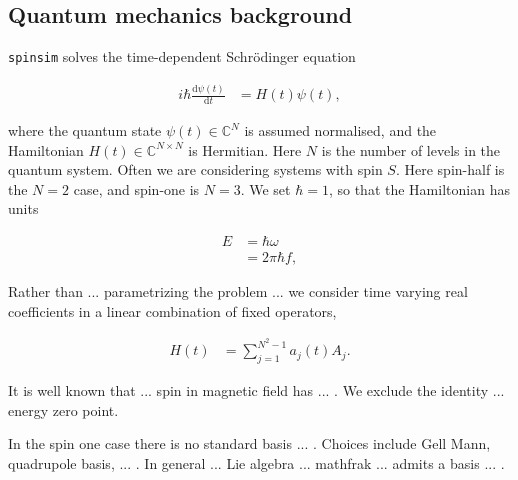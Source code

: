\documentclass{jors}
\begin{document}
	\subsection{Quantum mechanics background}
		\texttt{spinsim} solves the time-dependent Schr\"{o}dinger equation

		\begin{align}
			i\hbar\frac{\mathrm{d}\psi(t)}{\mathrm{d}t} &= H(t)\psi(t),\label{eq:schroedinger}
		\end{align}

		where the quantum state \(\psi(t) \in \mathbb{C}^N\) is assumed normalised, and the Hamiltonian \(H(t) \in \mathbb{C}^{N \times N}\) is Hermitian. Here \(N\) is the number of levels in the quantum system. Often we are considering systems with spin \(S\). Here spin-half is the \(N = 2\) case, and spin-one is \(N = 3\). We set \(\hbar = 1\), so that the Hamiltonian has units 
		
		
		\begin{align}
			E &= \hbar \omega\\
			&= 2\pi\hbar f,
		\end{align}
		
		Rather than ... parametrizing the problem ... we consider time varying real coefficients in a linear combination of fixed operators,

		\begin{align}
			H(t) &= \sum_{j = 1}^{N^2 - 1} a_j(t) A_j.
		\end{align}
		
		It is well known that ... spin in magnetic field has ... . We exclude the identity ... energy zero point.

		In the spin one case there is no standard basis ... . Choices include Gell Mann, quadrupole basis, ... . In general ... Lie algebra ... mathfrak ... admits a basis ... .
\end{document}
